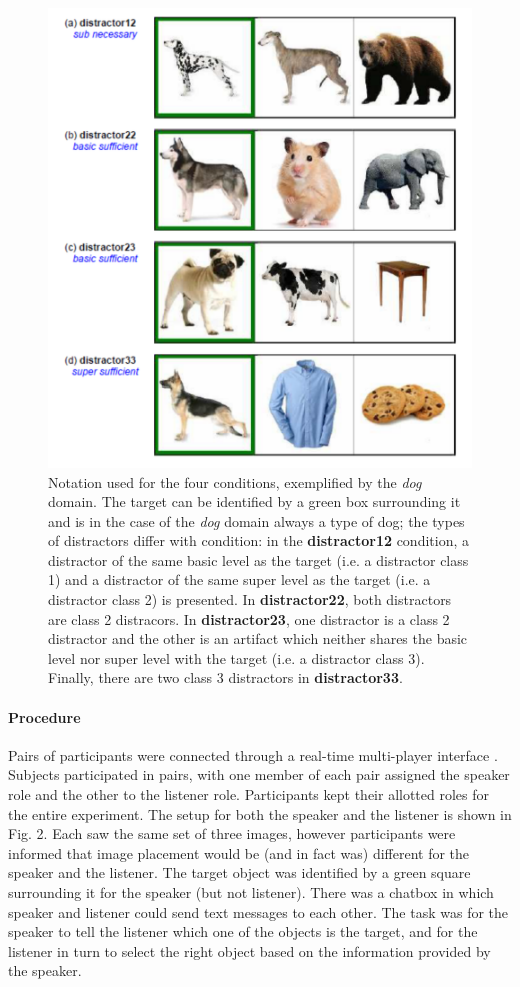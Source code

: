 \documentclass[10pt,letterpaper]{article}
\begin{document}
\begin{figure}[ht!]
\centering
\includegraphics[width=.5\textwidth]{graphs/design}
\caption{Notation used for the four conditions, exemplified by the \textit{dog} domain. The target can be identified by a green box surrounding it and is in the case of the \textit{dog} domain always a type of dog; the types of distractors differ with condition: in the  \textbf{distractor12} condition, a distractor of the same basic level as the target (i.e. a distractor class 1) and a distractor of the same super level as the target (i.e. a distractor class 2) is presented. In \textbf{distractor22}, both distractors are class 2 distracors. In \textbf{distractor23}, one distractor is a class 2 distractor and the other is an artifact which neither shares the basic level nor super level with the target (i.e. a distractor class 3). Finally, there are two class 3 distractors in \textbf{distractor33}.}
\label{fig:design}
\end{figure}

\paragraph{\bf Procedure}
Pairs of participants were connected through a real-time multi-player interface \cite{Hawkins15_RealTimeWebExperiments}. Subjects participated in pairs, with one member of each pair assigned the speaker role and the other to the listener role. Participants kept their allotted roles for the entire experiment. 
The setup for both the speaker and the listener is shown in Fig. 2. Each saw the same set of three images, however participants were informed that image placement would be (and in fact was) different for the speaker and the listener. The target object was identified by a green square surrounding it for the speaker (but not listener). There was a chatbox in which speaker and listener could send text messages to each other. The task was for the speaker to tell the listener which one of the objects is the target, and for the listener in turn to select the right object based on the information provided by the speaker. 
\end{document}

